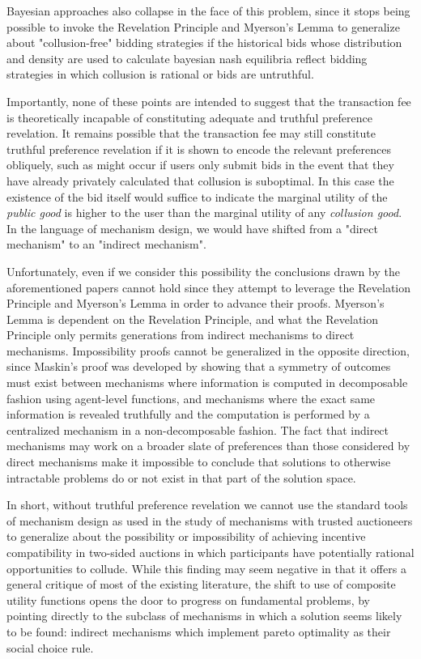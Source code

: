 \documentclass[oneside]{article}   	%
\begin{document}
Bayesian approaches also collapse in the face of this problem, since it stops being possible to invoke the Revelation Principle and Myerson's Lemma to generalize about "collusion-free" bidding strategies if the historical bids whose distribution and density are used to calculate bayesian nash equilibria reflect bidding strategies in which collusion is rational or bids are untruthful.

Importantly, none of these points are intended to suggest that the transaction fee is theoretically incapable of constituting adequate and truthful preference revelation. It remains possible that the transaction fee may still constitute truthful preference revelation if it is shown to encode the relevant preferences obliquely, such as might occur if users only submit bids in the event that they have already privately calculated that collusion is suboptimal. In this case the existence of the bid itself would suffice to indicate the marginal utility of the \textit{public good} is higher to the user than the marginal utility of any \textit{collusion good}. In the language of mechanism design, we would have shifted from a "direct mechanism" to an "indirect mechanism".

Unfortunately, even if we consider this possibility the conclusions drawn by the aforementioned papers cannot hold since they attempt to leverage the Revelation Principle and Myerson's Lemma in order to advance their proofs. Myerson's Lemma is dependent on the Revelation Principle, and what the Revelation Principle only permits generations from indirect mechanisms to direct mechanisms. Impossibility proofs cannot be generalized in the opposite direction, since Maskin's proof was developed by showing that a symmetry of outcomes must exist between mechanisms where information is computed in decomposable fashion using agent-level functions, and mechanisms where the exact same information is revealed truthfully and the computation is performed by a centralized mechanism in a non-decomposable fashion. The fact that indirect mechanisms may work on a broader slate of preferences than those considered by direct mechanisms make it impossible to conclude that solutions to otherwise intractable problems do or not exist in that part of the solution space.

In short, without truthful preference revelation we cannot use the standard tools of mechanism design as used in the study of mechanisms with trusted auctioneers to generalize about the possibility or impossibility of achieving incentive compatibility in two-sided auctions in which participants have potentially rational opportunities to collude. While this finding may seem negative in that it offers a general critique of most of the existing literature, the shift to use of composite utility functions opens the door to progress on fundamental problems, by pointing directly to the subclass of mechanisms in which a solution seems likely to be found: indirect mechanisms which implement pareto optimality as their social choice rule.
\end{document}
